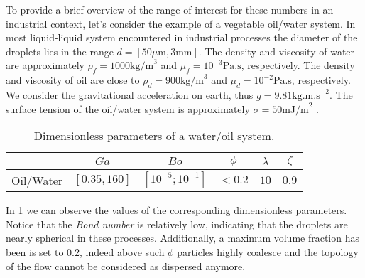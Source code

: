 To provide a brief overview of the range of interest for these numbers in an industrial context, let's consider the example of a vegetable oil/water system.
In most liquid-liquid system encountered in industrial processes the diameter of the droplets lies in the range $d = [50 \mu \text{m}, 3 \text{mm}]$.
The density and viscosity of water are approximately $\rho_f = 1000 \text{kg/m}^3$ and $\mu_f = 10^{-3} \text{Pa.s}$, respectively.
The density and viscosity of oil are close to $\rho_d = 900 \text{kg/m}^3$ and $\mu_d = 10^{-2} \text{Pa.s}$, respectively.
We consider the gravitational acceleration on earth, thus $g= 9.81 \text{kg.m.s}^{-2}$.
The surface tension of the oil/water system is approximately $\sigma = 50 \text{mJ/m}^2$ \citep{de2015gouttes}. 
\begin{table}[h!]
    \centering
    \caption{Dimensionless parameters of a water/oil system.}
    \begin{tabular}{|c||c|c|c|c|c|}
        \hline&$Ga$&$Bo$&$\phi$&$\lambda$&$\zeta$\\ \hline
        \hline Oil/Water&$[0.35,160]$&$[10^{-5};10^{-1}]$&$<0.2$&$10$&$0.9$\\ \hline
    \end{tabular}
    \label{tab:parameters_exp}
\end{table}
In \ref{tab:parameters_exp} we can observe the values of the corresponding dimensionless parameters.  
Notice that the \textit{Bond number} is relatively low, indicating that the droplets are nearly spherical in these processes.
Additionally, a maximum volume fraction has been is set to $0.2$, indeed above such $\phi$ particles highly coalesce and the topology of the flow cannot be considered as dispersed anymore. 


